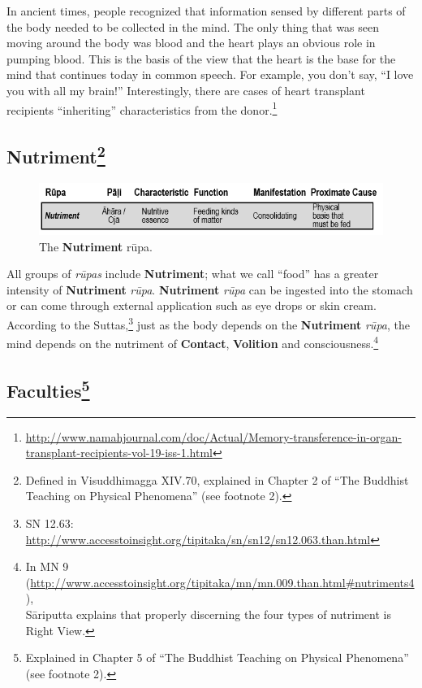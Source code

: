 In ancient times, people recognized that information sensed by different parts of the body needed to be collected in the mind. The only thing that was seen moving around the body was blood and the heart plays an obvious role in pumping blood. This is the basis of the view that the heart is the base for the mind that continues today in common speech. For example, you don’t say, “I love you with all my brain!” Interestingly, there are cases of heart transplant recipients “inheriting” characteristics from the donor.\footnote{\url{http://www.namahjournal.com/doc/Actual/Memory-transference-in-organ-transplant-recipients-vol-19-iss-1.html}}

\subsection*{Nutriment\footnote{Defined in Visuddhimagga XIV.70, explained in Chapter 2 of “The Buddhist Teaching on Physical Phenomena” (see footnote 2). }}

\begin{figure}[h]
\centering
\includegraphics[width=0.8\linewidth]{./Diagrams/Nutriment}
\caption{The \textbf{Nutriment} rūpa.}
\label{fig:Nutriment}
\end{figure}

All groups of \textit{rūpas} include \textbf{Nutriment}; what we call “food” has a greater intensity of \textbf{Nutriment} \textit{rūpa}. \textbf{Nutriment} \textit{rūpa} can be ingested into the stomach or can come through external application such as eye drops or skin cream. According to the Suttas,\footnote{SN 12.63: \url{http://www.accesstoinsight.org/tipitaka/sn/sn12/sn12.063.than.html}} just as the body depends on the \textbf{Nutriment} \textit{rūpa}, the mind depends on the nutriment of \textbf{Contact}, \textbf{Volition} and consciousness.\footnote{In MN 9 (\url{http://www.accesstoinsight.org/tipitaka/mn/mn.009.than.html\#nutriments4}),\\ Sāriputta explains that properly discerning the four types of nutriment is Right View.}

\subsection*{Faculties\footnote{Explained in Chapter 5 of “The Buddhist Teaching on Physical Phenomena” (see footnote 2).}}

